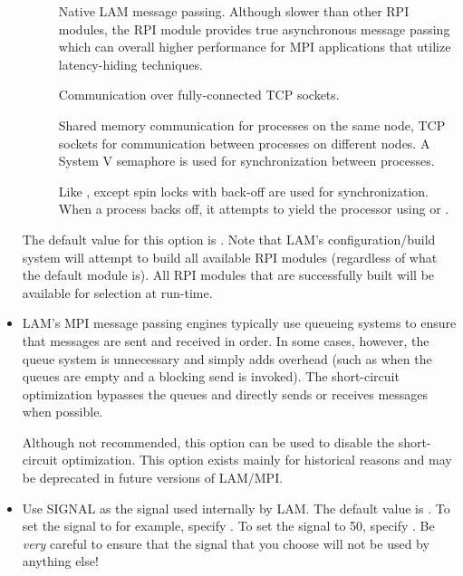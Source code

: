 \begin{itemize}
\begin{description}
  \item[] Native LAM message passing.  Although slower than
    other RPI modules, the  RPI module provides true
    asynchronous message passing which can overall higher performance
    for MPI applications that utilize latency-hiding techniques.
    
  \item[] Communication over fully-connected TCP sockets.

  \item[] Shared memory communication for processes on
    the same node, TCP sockets for communication between processes on
    different nodes.  A System V semaphore is used for synchronization
    between processes.
    
  \item[] Like , except spin locks with back-off
    are used for synchronization.  When a process backs off, it
    attempts to yield the processor using  or
    .
  \end{description}
  
  The default value for this option is .  Note that LAM's
  configuration/build system will attempt to build all available RPI
  modules (regardless of what the default module is).  All RPI modules
  that are successfully built will be available for selection at
  run-time.
  

\item {}

  LAM's MPI message passing engines typically use queueing systems to
  ensure that messages are sent and received in order.  In some cases,
  however, the queue system is unnecessary and simply adds overhead
  (such as when the queues are empty and a blocking send is invoked).
  The short-circuit optimization bypasses the queues and directly
  sends or receives messages when possible.
  
  Although not recommended, this option can be used to disable the
  short-circuit optimization.  This option exists mainly for
  historical reasons and may be deprecated in future versions of
  LAM/MPI.


\item {}
  
  Use SIGNAL as the signal used internally by LAM. The default value
  is .  To set the signal to  for
  example, specify .  To set the signal
  to 50, specify .  Be {\em very} careful to
  ensure that the signal that you choose will not be used by anything
  else!



\end{itemize}
